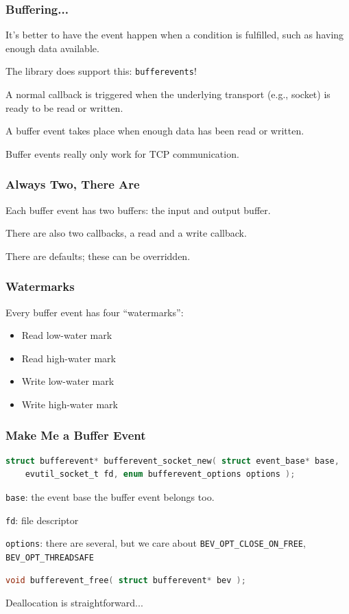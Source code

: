 \begin{frame}
	\frametitle{Buffering...}

	It's better to have the event happen when a condition is fulfilled, such as having enough data available.

	The library does support this: \texttt{bufferevents}!

	A normal callback is triggered when the underlying transport (e.g., socket) is ready to be read or written.

	A buffer event takes place when enough data has been read or written.

	Buffer events really only work for TCP communication.

\end{frame}


\begin{frame}
	\frametitle{Always Two, There Are}

	Each buffer event has two buffers: the input and output buffer.

	There are also two callbacks, a read and a write callback.

	There are defaults; these can be overridden.

\end{frame}


\begin{frame}
	\frametitle{Watermarks}

	Every buffer event has four ``watermarks'':
	\begin{itemize}
		\item Read low-water mark
		\item Read high-water mark
		\item Write low-water mark
		\item Write high-water mark
	\end{itemize}


\end{frame}


\begin{frame}[fragile]
	\frametitle{Make Me a Buffer Event}

	\begin{lstlisting}[language=C]
struct bufferevent* bufferevent_socket_new( struct event_base* base, 
    evutil_socket_t fd, enum bufferevent_options options );
\end{lstlisting}

	\texttt{base}: the event base the buffer event belongs too.

	\texttt{fd}: file descriptor

	\texttt{options}: there are several, but we care about \texttt{BEV\_OPT\_CLOSE\_ON\_FREE}, \texttt{BEV\_OPT\_THREADSAFE}


	\begin{lstlisting}[language=C]
void bufferevent_free( struct bufferevent* bev );
\end{lstlisting}

	Deallocation is straightforward...
\end{frame}

